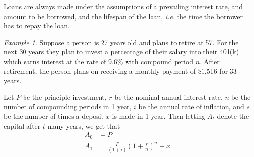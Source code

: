 \documentclass[leqno]{article}
\theoremstyle{definition}
\theoremstyle{remark}
\newtheorem{example}{Example}[section]
\begin{document}
    Loans are always made under the assumptions of a prevailing interest rate, and amount to be borrowed, and the lifespan of the loan, \textit{i.e.} the time the borrower has to repay the loan. 
    \begin{example}
        Suppose a person is 27 years old and plans to retire at 57. For the next 30 years they plan to invest a percentage of their salary into their 401(k) which earns interest at the rate of 9.6\% with compound period $n$. After retirement, the person plans on receiving a monthly payment of \$1,516 for 33 years. 
    \end{example}
    Let $P$ be the principle investment, $r$ be the nominal annual interest rate, $n$ be the number of compounding periods in 1 year, $i$ be the annual rate of inflation, and $s$ be the number of times a deposit $x$ is made in 1 year. Then letting $A_t$ denote the capital after $t$ many years, we get that
        \begin{equation*}
            \begin{split}
                A_0&=P \\
                A_1&=\frac{P}{(1+i)}\left(1+\frac{r}{n}\right)^n+x
            \end{split}
        \end{equation*}
\end{document}

